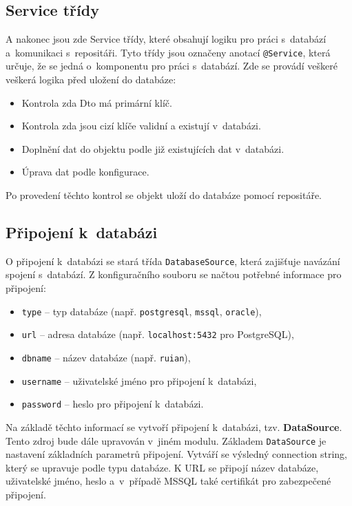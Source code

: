 \subsection{Service třídy}
A nakonec jsou zde Service třídy, které obsahují logiku pro práci s~databází a~komunikaci s~repositáři.
Tyto třídy jsou označeny anotací \texttt{@Service}, která určuje, že se jedná o~komponentu pro práci s~databází.
Zde se provádí veškeré veškerá logika před uložení do databáze:
\begin{itemize}
    \item Kontrola zda Dto má primární klíč.
    \item Kontrola zda jsou cizí klíče validní a existují v~databázi.
    \item Doplnění dat do objektu podle již existujících dat v~databázi.
    \item Úprava dat podle konfigurace.
\end{itemize}
Po provedení těchto kontrol se objekt uloží do databáze pomocí repositáře. 

\subsection{Připojení k~databázi}
O připojení k~databázi se stará třída \texttt{DatabaseSource}, která zajišťuje navázání spojení s~databází.  
Z konfiguračního souboru se načtou potřebné informace pro připojení:
\begin{itemize}
    \item \texttt{type} -- typ databáze (např. \texttt{postgresql}, \texttt{mssql}, \texttt{oracle}),
    \item \texttt{url} -- adresa databáze (např. \texttt{localhost:5432} pro PostgreSQL),
    \item \texttt{dbname} -- název databáze (např. \texttt{ruian}),
    \item \texttt{username} -- uživatelské jméno pro připojení k~databázi,
    \item \texttt{password} -- heslo pro připojení k~databázi.
\end{itemize}

Na základě těchto informací se vytvoří připojení k~databázi, tzv. \textbf{DataSource}.
Tento zdroj bude dále upravován v~jiném modulu.  
Základem \texttt{DataSource} je nastavení základních parametrů připojení.  
Vytváří se výsledný connection string, který se upravuje podle typu databáze.  
K URL se připojí název databáze, uživatelské jméno, heslo a~v~případě MSSQL také certifikát pro zabezpečené připojení.

